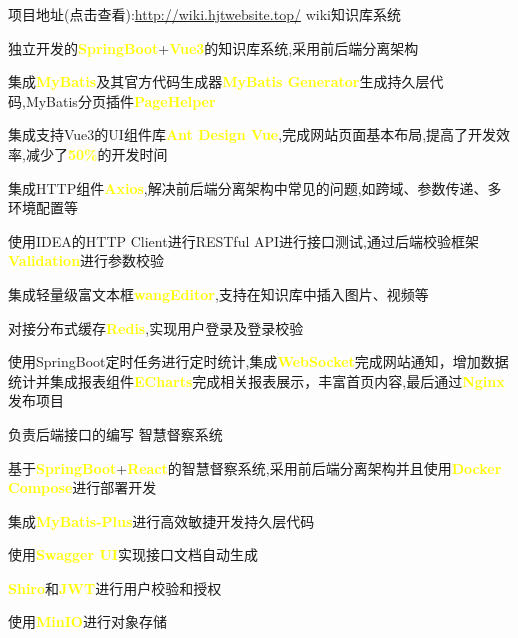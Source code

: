 \begin{cventries}
	\cventry
	{项目地址(点击查看):\url{http://wiki.hjtwebsite.top/}} %
	{wiki知识库系统} %
	{} %
	{} %
	{
		\begin{cvitems} %
			\item {独立开发的\textcolor{yellow}{\textbf{SpringBoot}}+\textcolor{yellow}{\textbf{Vue3}}的知识库系统,采用前后端分离架构}
			\item {集成\textcolor{yellow}{\textbf{MyBatis}}及其官方代码生成器\textcolor{yellow}{\textbf{MyBatis Generator}}生成持久层代码,MyBatis分页插件\textcolor{yellow}{\textbf{PageHelper}}}
			\item {集成支持Vue3的UI组件库\textcolor{yellow}{\textbf{Ant Design Vue}},完成网站页面基本布局,提高了开发效率,减少了\textcolor{yellow}{\textbf{50\%}}的开发时间}
			\item {集成HTTP组件\textcolor{yellow}{\textbf{Axios}},解决前后端分离架构中常见的问题,如跨域、参数传递、多环境配置等}
			\item {使用IDEA的HTTP Client进行RESTful API进行接口测试,通过后端校验框架\textcolor{yellow}{\textbf{Validation}}进行参数校验}
			\item {集成轻量级富文本框\textcolor{yellow}{\textbf{wangEditor}},支持在知识库中插入图片、视频等}
			\item {对接分布式缓存\textcolor{yellow}{\textbf{Redis}},实现用户登录及登录校验}
			\item {使用SpringBoot定时任务进行定时统计,集成\textcolor{yellow}{\textbf{WebSocket}}完成网站通知，增加数据统计并集成报表组件\textcolor{yellow}{\textbf{ECharts}}完成相关报表展示，丰富首页内容,最后通过\textcolor{yellow}{\textbf{Nginx}}发布项目}
		\end{cvitems}
	}
	\cventry
	{负责后端接口的编写} %
	{智慧督察系统} %
	{} %
	{} %
	{
		\begin{cvitems} %
			\item {基于\textcolor{yellow}{\textbf{SpringBoot}}+\textcolor{yellow}{\textbf{React}}的智慧督察系统,采用前后端分离架构并且使用\textcolor{yellow}{\textbf{Docker Compose}}进行部署开发}
			\item {集成\textcolor{yellow}{\textbf{MyBatis-Plus}}进行高效敏捷开发持久层代码}
			\item {使用\textcolor{yellow}{\textbf{Swagger UI}}实现接口文档自动生成}
			\item {\textcolor{yellow}{\textbf{Shiro}}和\textcolor{yellow}{\textbf{JWT}}进行用户校验和授权}
			\item {使用\textcolor{yellow}{\textbf{MinIO}}进行对象存储}
		\end{cvitems}
	}
	
\end{cventries}
